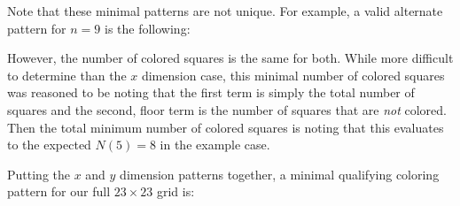 \documentclass{article}
\begin{document}
{\begin{center}
\begin{minipage}[t]{0.5\textwidth}
{      }
    \end{minipage}
  \end{center}
  Note that these minimal patterns are not unique.
  For example, a valid alternate pattern for $n = 9$ is the following:
  \begin{center}
    \begin{minipage}[t]{0.5\textwidth}
    \end{minipage}
  \end{center}
  However, the number of colored squares is the same for both.
  While more difficult to determine than the $x$ dimension case, this minimal number of colored squares was reasoned to be
  noting that the first term is simply the total number of squares and the second, floor term is the number of squares that are \emph{not} colored.
  Then the total minimum number of colored squares is
  noting that this evaluates to the expected $N(5) = 8$ in the example case.

  Putting the $x$ and $y$ dimension patterns together, a minimal qualifying coloring pattern for our full $23 \times 23$ grid is:
  \begin{center}
    \newcommand\offrow[1]{
      \foreach \x in {1,...,23} {
          \xxiii@gridbox{\x}{#1}
        }
    }

    \newcommand\onrow[1]{
      \offrow{#1}

      \xxiii@gridboxc{2}{#1}
      \xxiii@gridboxc{5}{#1}
      \xxiii@gridboxc{8}{#1}
      \xxiii@gridboxc{11}{#1}
      \xxiii@gridboxc{14}{#1}
      \xxiii@gridboxc{17}{#1}
      \xxiii@gridboxc{20}{#1}
      \xxiii@gridboxc{23}{#1}
    }

\end{center}}
\end{document}
